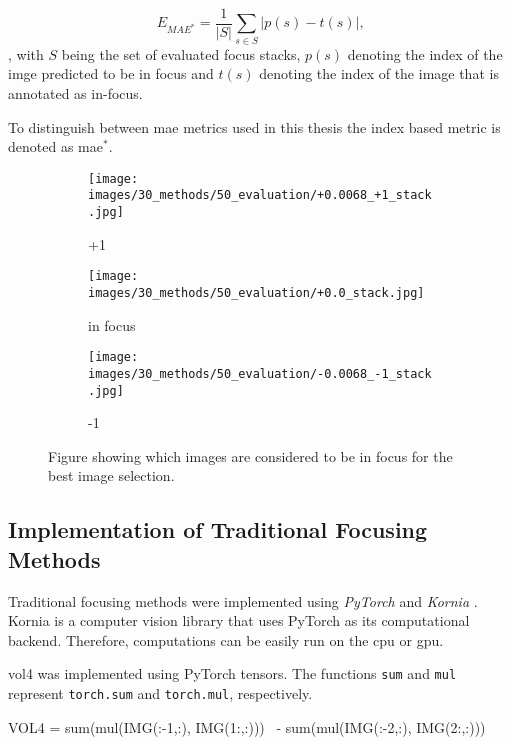 $$E_{MAE^*} = \frac{1}{|S|}\sum_{s \in S} |p(s) - t(s)| \text{,}$$, with $S$ being the set of evaluated focus stacks, $p(s)$ denoting the index of the imge predicted to be in focus and $t(s)$ denoting the index of the image that is annotated as in-focus.

To distinguish between \ac{mae} metrics used in this thesis the index based metric is denoted as \ac{mae}$^*$.

\begin{figure}[tb]
    \centering
    \begin{subfigure}[t]{0.3\textwidth}
        \centering
        \texttt{[image: images/30\_methods/50\_evaluation/+0.0068\_+1\_stack.jpg]}
        \caption{+1}
    \end{subfigure}
    \begin{subfigure}[t]{0.3\textwidth}
        \centering
        \texttt{[image: images/30\_methods/50\_evaluation/+0.0\_stack.jpg]}
        \caption{in focus}
    \end{subfigure}
    \begin{subfigure}[t]{0.3\textwidth}
        \centering
        \texttt{[image: images/30\_methods/50\_evaluation/-0.0068\_-1\_stack.jpg]}
        \caption{-1}
    \end{subfigure}

    \caption{Figure showing which images are considered to be in focus for the best image selection.}
    \label{fig:Methods:Data:InFocusExampleImages}
\end{figure}


\subsection{Implementation of Traditional Focusing Methods}
\label{sec:Methods:Evaluation:Traditional}

Traditional focusing methods were implemented using \emph{PyTorch} \cite{paszke2019pytorch} and \emph{Kornia} \cite{riba2020kornia}. Kornia is a computer vision library that uses PyTorch as its computational backend. Therefore, computations can be easily run on the \ac{cpu} or \ac{gpu}.


\Ac{vol4} was implemented using PyTorch tensors. The functions \texttt{sum} and \texttt{mul} represent \texttt{torch.sum} and \texttt{torch.mul}, respectively.

\begin{python}
VOL4 = sum(mul(IMG(:-1,:), IMG(1:,:)))      \
        - sum(mul(IMG(:-2,:), IMG(2:,:)))
\end{python}


